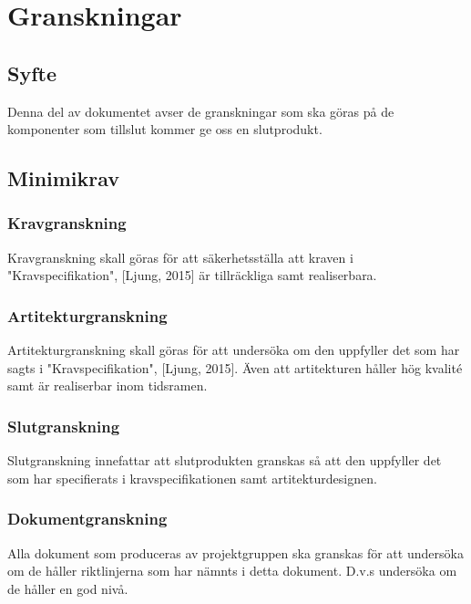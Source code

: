 \section{Granskningar}

\subsection{Syfte}
Denna del av dokumentet avser de granskningar som ska göras på de komponenter som tillslut kommer ge oss en slutprodukt. 

\subsection{Minimikrav}

\subsubsection{Kravgranskning}
Kravgranskning skall göras för att säkerhetsställa att kraven i "Kravspecifikation", [Ljung, 2015] är tillräckliga samt realiserbara.

\subsubsection{Artitekturgranskning}
Artitekturgranskning skall göras för att undersöka om den uppfyller det som har sagts i "Kravspecifikation", [Ljung, 2015]. Även att artitekturen håller hög kvalité samt är realiserbar inom tidsramen. 

\subsubsection{Slutgranskning}
Slutgranskning innefattar att slutprodukten granskas så att den uppfyller det som har specifierats i kravspecifikationen samt artitekturdesignen. 

\subsubsection{Dokumentgranskning}
Alla dokument som produceras av projektgruppen ska granskas för att undersöka om de håller riktlinjerna som har nämnts i detta dokument. D.v.s undersöka om de håller en god nivå. 



